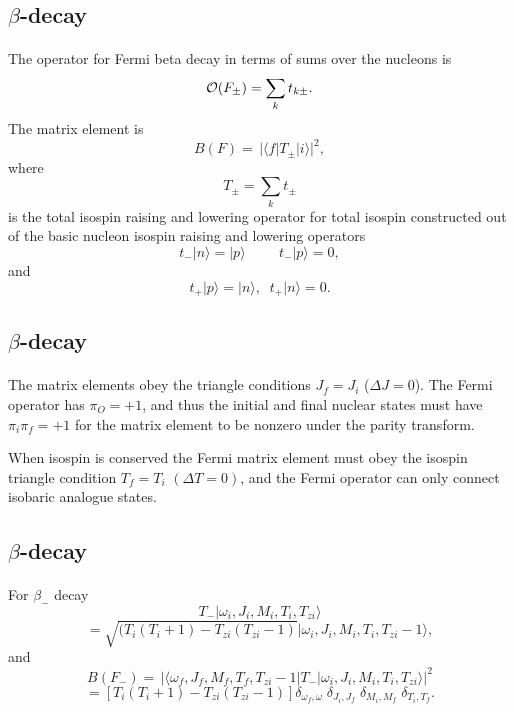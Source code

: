 \documentclass[%
twoside,                 %
final,                   %
10pt]{article}
\begin{document}
\subsection*{$\beta$-decay}

\paragraph{}
The operator for Fermi beta decay in terms of sums
over the nucleons is
\[
{\cal O}(F_{\pm}) =  \displaystyle\sum _{k} t_{k\pm}.
\]
The matrix element is
\[
B(F) =\, \vert \langle f\vert  T_{\pm} \vert i\rangle\vert ^{2}, 
\]
where
\[
T_{\pm} = \sum _{k} t_{\pm}  
\]
is the total isospin raising and lowering operator for total
isospin constructed out of the
basic nucleon isospin raising and lowering operators
\[
t_{-}\vert n\rangle=\vert p\rangle \hspace{1cm} t_{-}\vert p\rangle= 0,
\]
and
\[
t_{+}\vert p\rangle=\vert n\rangle, \;\; t_{+}\vert n\rangle= 0.  
\]



\subsection*{$\beta$-decay}

\paragraph{}
The matrix elements obey the triangle
conditions $J_{f}=J_{i}$ ($\Delta J=0$). The Fermi operator has
$\pi _{O}=+1$, and thus the
initial and final nuclear states must have $\pi _{i}\pi _{f}=+1$ for
the matrix element to be
nonzero under the parity transform.

When isospin is conserved
the Fermi matrix element must obey the isospin triangle condition
$T_{f}=T_{i}$ $(\Delta T=0)$, and the Fermi operator can only connect
isobaric analogue states.



\subsection*{$\beta$-decay}

\paragraph{}
For $\beta_{-}$ decay
\[
T_{-}\vert \omega _{i},J_{i},M_{i},T_{i},T_{zi}\rangle
\]
\[
= \sqrt{(T_{i}(T_{i}+1)-T_{zi}(T_{zi}-1)}\vert \omega _{i},J_{i},M_{i},T_{i},T_{zi}-1\rangle,      
\]
and
\[
B(F_{-}) =\, \vert \langle \omega _{f},J_{f},M_{f},T_{f},T_{zi}-1\vert T_{-}\vert \omega 
_{i},J_{i},M_{i},T_{i},T_{zi}\rangle\vert ^{2}
\]
\[
= [T_{i}(T_{i}+1)-T_{zi}(T_{zi}-1)]
\delta _{\omega _{f},\omega }\;\delta _{J_{i},J_{f}}\;\delta _{M_{i},M_{f}}\;\delta _{T_{i},T_{f}}. 
\]
\end{document}
